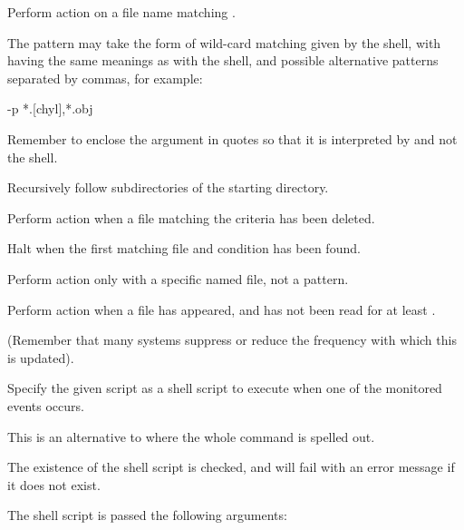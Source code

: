
Perform action on a file name matching .

The pattern may take the form of wild-card matching given by the shell, with \exampletext{*} 
\exampletext{[a-z]} \exampletext{[!a-z]} having the same meanings as with the shell, and possible alternative patterns
separated by commas, for example:

\begin{expara}

{}-p {\textquotesingle}*.[chyl],*.obj{\textquotesingle}

\end{expara}

Remember to enclose the argument in quotes so that it is interpreted by \PrBtfilemon{} and not the shell.


Recursively follow subdirectories of the starting directory.


Perform action when a file matching the criteria has been deleted.


Halt \PrBtfilemon{} when the first matching file and condition has been found.


Perform action only with a specific named file, not a pattern.


Perform action when a file has appeared, and has not been read for at least .

(Remember that many systems suppress or reduce the frequency with which this is updated).


Specify the given script as a shell script to execute when one of the monitored events occurs.

This is an alternative to  where the whole command is spelled out.

The existence of the shell script is checked, and \PrBtfilemon{} will fail with an error message if it does not exist.

The shell script is passed the following arguments:

